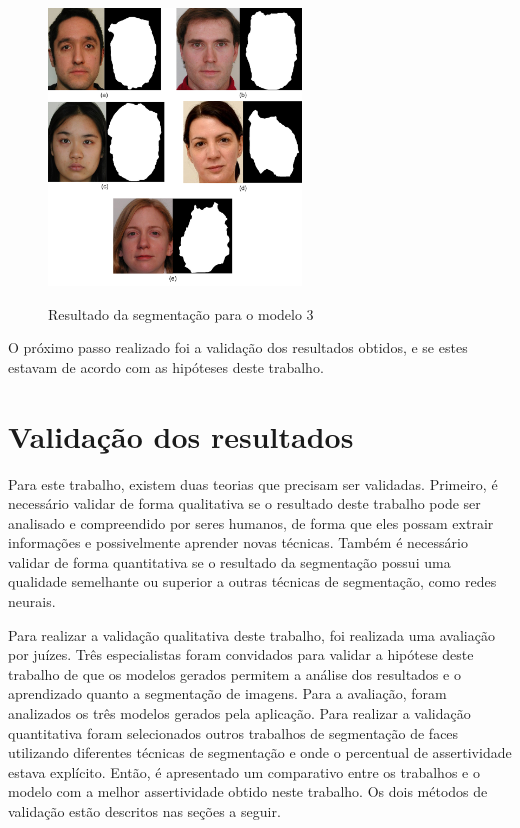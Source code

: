\documentclass[12pt,oneside,a4paper,english,french,spanish,brazil,]{abntex2}
\begin{document}
\begin{figure}[ht]
\centering
\caption{Resultado da segmentação para o modelo 3}
\includegraphics[width=0.6\textwidth]{imagens/DES_Resultado_3.pdf}
\sourceAuthor{}
\label{fig:DES_Resultado_3}
\end{figure}

O próximo passo realizado foi a validação dos resultados obtidos, e se estes estavam de acordo com as hipóteses deste trabalho.

\section{Validação dos resultados}

Para este trabalho, existem duas teorias que precisam ser validadas. Primeiro, é necessário validar de forma qualitativa se o resultado deste trabalho pode ser analisado e compreendido por seres humanos, de forma que eles possam extrair informações e possivelmente aprender novas técnicas. Também é necessário validar de forma quantitativa se o resultado da segmentação possui uma qualidade semelhante ou superior a outras técnicas de segmentação, como redes neurais.

Para realizar a validação qualitativa deste trabalho, foi realizada uma avaliação por juízes. Três especialistas foram convidados para validar a hipótese deste trabalho de que os modelos gerados permitem a análise dos resultados e o aprendizado quanto a segmentação de imagens. Para a avaliação, foram analizados os três modelos gerados pela aplicação. Para realizar a validação quantitativa foram selecionados outros trabalhos de segmentação de faces utilizando diferentes técnicas de segmentação e onde o percentual de assertividade estava explícito. Então, é apresentado um comparativo entre os trabalhos e o modelo com a melhor assertividade obtido neste trabalho. Os dois métodos de validação estão descritos nas seções a seguir.
\end{document}
